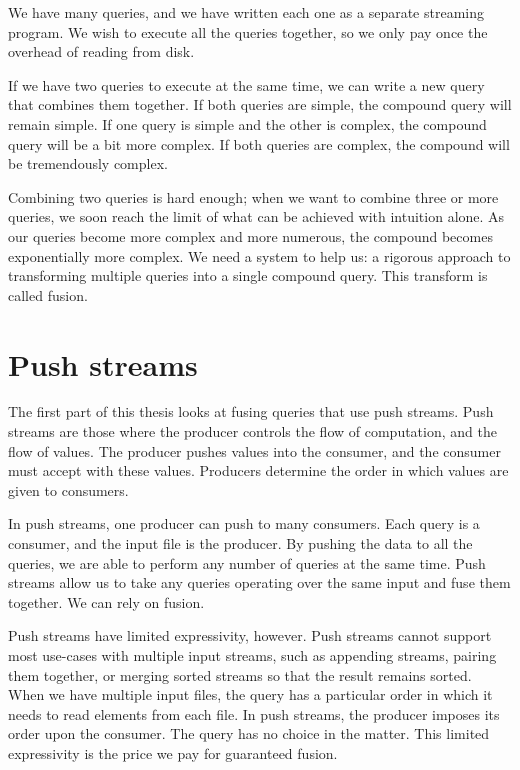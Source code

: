 We have many queries, and we have written each one as a separate streaming program.
We wish to execute all the queries together, so we only pay once the overhead of reading from disk.

If we have two queries to execute at the same time, we can write a new query that combines them together.
If both queries are simple, the compound query will remain simple.
If one query is simple and the other is complex, the compound query will be a bit more complex.
If both queries are complex, the compound will be tremendously complex.

Combining two queries is hard enough; when we want to combine three or more queries, we soon reach the limit of what can be achieved with intuition alone.
As our queries become more complex and more numerous, the compound becomes exponentially more complex.
We need a system to help us: a rigorous approach to transforming multiple queries into a single compound query.
This transform is called fusion.

\section{Push streams}

The first part of this thesis looks at fusing queries that use push streams.
Push streams are those where the producer controls the flow of computation, and the flow of values.
The producer pushes values into the consumer, and the consumer must accept with these values.
Producers determine the order in which values are given to consumers.

In push streams, one producer can push to many consumers.
Each query is a consumer, and the input file is the producer.
By pushing the data to all the queries, we are able to perform any number of queries at the same time.
Push streams allow us to take any queries operating over the same input and fuse them together.
We can rely on fusion.

Push streams have limited expressivity, however.
Push streams cannot support most use-cases with multiple input streams, such as appending streams, pairing them together, or merging sorted streams so that the result remains sorted.
When we have multiple input files, the query has a particular order in which it needs to read elements from each file.
In push streams, the producer imposes its order upon the consumer.
The query has no choice in the matter.
This limited expressivity is the price we pay for guaranteed fusion.

